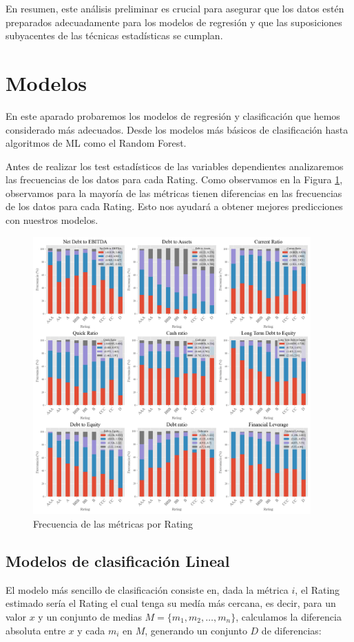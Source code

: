 \documentclass{article}
\begin{document}
En resumen, este análisis preliminar es crucial para asegurar que los datos estén preparados adecuadamente para los modelos de regresión y que las suposiciones subyacentes de las técnicas estadísticas se cumplan.


\section{Modelos}\label{sec:modelos}

En este aparado probaremos los modelos de regresión y clasificación que hemos considerado más adecuados. Desde los modelos más básicos de clasificación hasta algoritmos de ML como el Random Forest.

Antes de realizar los test estadísticos de las variables dependientes analizaremos las frecuencias de los datos para cada Rating. Como observamos en la Figura \ref{fig:freq_rat}, observamos para la mayoría de las métricas tienen diferencias en las frecuencias de los datos para cada Rating. Esto nos ayudará a obtener mejores predicciones con nuestros modelos.

\begin{figure}[H]
\centering
\includegraphics[width=0.95\textwidth]{frecuencias_por_rating.png}
\caption{Frecuencia de las métricas por Rating}
\label{fig:freq_rat}
\end{figure}

\subsection{Modelos de clasificación Lineal}
El modelo más sencillo de clasificación consiste en, dada la métrica $i$, el Rating estimado sería el Rating el cual tenga su medía más cercana, es decir, para un valor \( x \) y un conjunto de medias \( M = \{m_1, m_2, \ldots, m_n\} \), calculamos la diferencia absoluta entre \( x \) y cada \( m_i \) en \( M \), generando un conjunto \( D \) de diferencias:
\end{document}
